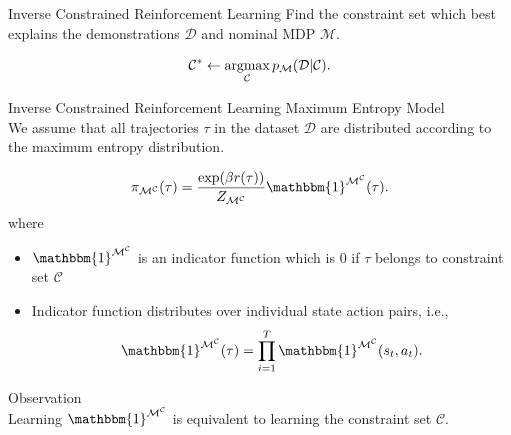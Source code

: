 \documentclass[t, pdf, aspectratio=169]{beamer}
\begin{document}
\begin{frame}{Inverse Constrained Reinforcement Learning}
\vspace{15mm}
\vspace{2.5mm}
Find the constraint set which best explains the demonstrations $\mathcal{D}$ and nominal MDP $\mathcal{M}$.

\begin{equation}
\mathcal{C}^* \leftarrow \mathop{\rm argmax}_\mathcal{C} p_\mathcal{M}(\mathcal{D}\vert \mathcal{C}).
\label{eq:uniform_prior}
\end{equation}
\end{frame}

\begin{frame}{Inverse Constrained Reinforcement Learning}
\textcolor{beamer@blendedblue}{\large{Maximum Entropy Model}}\\
\vspace{2.5mm}
We assume that all trajectories $\tau$ in the dataset $\mathcal{D}$ are distributed according to the maximum entropy distribution.

\begin{equation}
    \pi_{\mathcal{M}^{\mathcal{C}}}(\tau) = \frac{\exp(\beta r(\tau))}{Z_{\mathcal{M}^{\mathcal{C}}}}\mathbbm{1}^{\mathcal{M}^{\mathcal{C}}}(\tau).
    \label{eq:maxent}
\end{equation}
where \\
\begin{itemize}
    \item $\mathbbm{1}^{\Mcal^{\Ccal}}$ is an indicator function which is $0$ if $\tau$ belongs to constraint set $\mathcal{C}$
    \item Indicator function distributes over individual state action pairs, i.e., $$\mathbbm{1}^{\mathcal{M}^{\mathcal{C}}}(\tau) = \prod_{i=1}^T\mathbbm{1}^{\mathcal{M}^{\mathcal{C}}}(s_t,a_t).$$
\end{itemize}

\pause

\textcolor{beamer@blendedblue}{\large{Observation}} \\
\vspace{2.5mm}
Learning $\mathbbm{1}^{\mathcal{M}^\mathcal{C}}$ is equivalent to learning the constraint set $\mathcal{C}$.
\end{frame}
\end{document}
